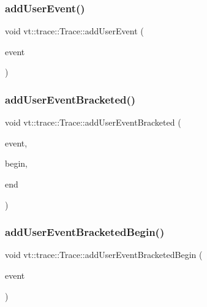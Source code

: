 \subsubsection{\texorpdfstring{add\+User\+Event()}{addUserEvent()}}
{\footnotesize\ttfamily void vt\+::trace\+::\+Trace\+::add\+User\+Event (\begin{DoxyParamCaption}\item[{\hyperlink{namespacevt_1_1trace_a5908920d051c144c89f17c69ed262350}{User\+Event\+I\+D\+Type}}]{event }\end{DoxyParamCaption})}

\mbox{\label{structvt_1_1trace_1_1_trace_ae57a7ff5517a5bc0694677f10810b545}} 
\subsubsection{\texorpdfstring{add\+User\+Event\+Bracketed()}{addUserEventBracketed()}}
{\footnotesize\ttfamily void vt\+::trace\+::\+Trace\+::add\+User\+Event\+Bracketed (\begin{DoxyParamCaption}\item[{\hyperlink{namespacevt_1_1trace_a5908920d051c144c89f17c69ed262350}{User\+Event\+I\+D\+Type}}]{event,  }\item[{double}]{begin,  }\item[{double}]{end }\end{DoxyParamCaption})}

\mbox{\label{structvt_1_1trace_1_1_trace_a1264ea508298bfeb6a6ef5e06d9214f9}} 
\subsubsection{\texorpdfstring{add\+User\+Event\+Bracketed\+Begin()}{addUserEventBracketedBegin()}}
{\footnotesize\ttfamily void vt\+::trace\+::\+Trace\+::add\+User\+Event\+Bracketed\+Begin (\begin{DoxyParamCaption}\item[{\hyperlink{namespacevt_1_1trace_a5908920d051c144c89f17c69ed262350}{User\+Event\+I\+D\+Type}}]{event }\end{DoxyParamCaption})}

